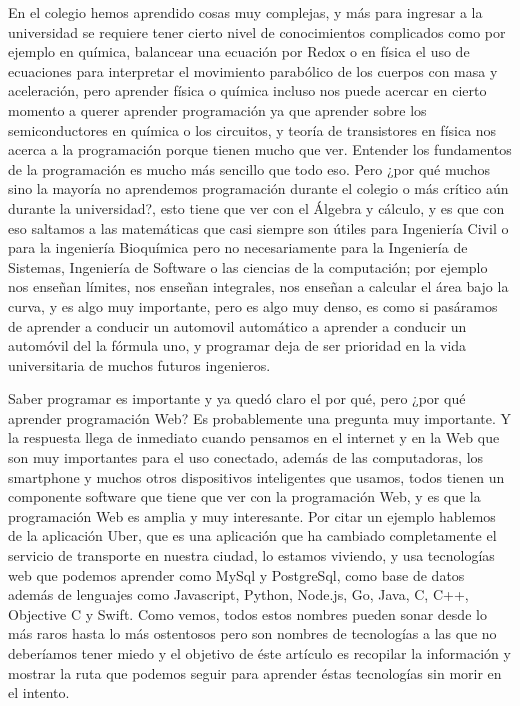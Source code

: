 \documentclass[a4paper, twocolumns]{IEEEtran}
\begin{document}
En el colegio hemos aprendido cosas muy complejas, y más para ingresar a la
universidad se requiere tener cierto nivel de conocimientos complicados como
por ejemplo en química, balancear una ecuación por Redox o en física el uso de
ecuaciones para interpretar el movimiento parabólico de los cuerpos con masa y
aceleración, pero aprender física o química incluso nos puede acercar en cierto
momento a querer aprender programación ya que aprender sobre los
semiconductores en química o los circuitos, y teoría de transistores en física
nos acerca a la programación porque tienen mucho que ver. Entender los
fundamentos de la programación es mucho más sencillo que todo eso. Pero ¿por
qué muchos sino la mayoría no aprendemos programación durante el colegio o más
crítico aún durante la universidad?, esto tiene que ver con el Álgebra y
cálculo, y es que con eso saltamos a las matemáticas que casi siempre son
útiles para Ingeniería Civil o para la ingeniería Bioquímica pero no
necesariamente para la Ingeniería de Sistemas, Ingeniería de Software o las
ciencias de la computación; por ejemplo nos enseñan límites, nos enseñan
integrales, nos enseñan a calcular el área bajo la curva, y es algo muy
importante, pero es algo muy denso, es como si pasáramos de aprender a conducir
un automovil automático a aprender a conducir un automóvil del la fórmula uno,
y programar deja de ser prioridad en la vida universitaria de muchos futuros
ingenieros.

Saber programar es importante y ya quedó claro el por qué, pero ¿por qué
aprender programación Web? Es probablemente una pregunta muy importante.
Y la respuesta llega de inmediato cuando pensamos en el internet y en la Web
que son muy importantes para el uso conectado, además de las computadoras, los
smartphone y muchos otros dispositivos inteligentes que usamos, todos tienen un
componente software que tiene que ver con la programación Web, y es que la
programación Web es amplia y muy interesante. Por citar un ejemplo hablemos de
la aplicación Uber, que es una aplicación que ha cambiado completamente el
servicio de transporte en nuestra ciudad, lo estamos viviendo, y usa
tecnologías web que podemos aprender como MySql y PostgreSql, como base de
datos además de lenguajes como Javascript, Python, Node.js, Go, Java, C, C++,
Objective C y Swift. Como vemos, todos estos nombres pueden sonar desde lo más
raros hasta lo más ostentosos pero son nombres de tecnologías a las que no
deberíamos tener miedo y el objetivo de éste artículo es recopilar la
información y mostrar la ruta que podemos seguir para aprender éstas
tecnologías sin morir en el intento.
\end{document}
